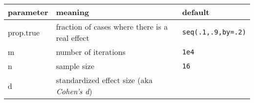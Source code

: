 \documentclass[]{article}
\begin{document}
\begin{longtable}[]{@{}lll@{}}
\toprule
\begin{minipage}[b]{0.18\columnwidth}\raggedright\strut
parameter\strut
\end{minipage} & \begin{minipage}[b]{0.56\columnwidth}\raggedright\strut
meaning\strut
\end{minipage} & \begin{minipage}[b]{0.18\columnwidth}\raggedright\strut
default\strut
\end{minipage}\tabularnewline
\midrule
\endhead
\begin{minipage}[t]{0.18\columnwidth}\raggedright\strut
prop.true\strut
\end{minipage} & \begin{minipage}[t]{0.56\columnwidth}\raggedright\strut
fraction of cases where there is a real effect\strut
\end{minipage} & \begin{minipage}[t]{0.18\columnwidth}\raggedright\strut
\texttt{seq(.1,.9,by=.2)}\strut
\end{minipage}\tabularnewline
\begin{minipage}[t]{0.18\columnwidth}\raggedright\strut
m\strut
\end{minipage} & \begin{minipage}[t]{0.56\columnwidth}\raggedright\strut
number of iterations\strut
\end{minipage} & \begin{minipage}[t]{0.18\columnwidth}\raggedright\strut
\texttt{1e4}\strut
\end{minipage}\tabularnewline
\begin{minipage}[t]{0.18\columnwidth}\raggedright\strut
n\strut
\end{minipage} & \begin{minipage}[t]{0.56\columnwidth}\raggedright\strut
sample size\strut
\end{minipage} & \begin{minipage}[t]{0.18\columnwidth}\raggedright\strut
\texttt{16}\strut
\end{minipage}\tabularnewline
\begin{minipage}[t]{0.18\columnwidth}\raggedright\strut
d\strut
\end{minipage} & \begin{minipage}[t]{0.56\columnwidth}\raggedright\strut
standardized effect size (aka \emph{Cohen's d})\strut
\end{minipage} & \begin{minipage}[t]{0.18\columnwidth}\raggedright\strut

\end{minipage}
\end{longtable}
\end{document}

